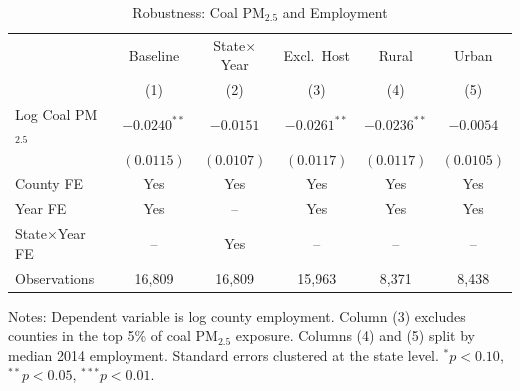 \begin{table}[t]
\centering
\caption{Robustness: Coal PM$_{2.5}$ and Employment}
\label{tab:robust}
\begin{tabular}{lccccc}
\hline\hline
 & Baseline & State$\times$Year & Excl.\ Host & Rural & Urban \\
 & (1) & (2) & (3) & (4) & (5) \\
\hline
Log Coal PM$_{2.5}$ & $-0.0240^{**}$ & $-0.0151$ & $-0.0261^{**}$ & $-0.0236^{**}$ & $-0.0054$ \\
 & $(0.0115)$ & $(0.0107)$ & $(0.0117)$ & $(0.0117)$ & $(0.0105)$ \\
\hline
County FE & Yes & Yes & Yes & Yes & Yes \\
Year FE & Yes & -- & Yes & Yes & Yes \\
State$\times$Year FE & -- & Yes & -- & -- & -- \\
Observations & 16,809 & 16,809 & 15,963 & 8,371 & 8,438 \\
\hline\hline
\end{tabular}
\begin{flushleft}\small
Notes: Dependent variable is log county employment. Column (3) excludes counties in the top 5\% of coal PM$_{2.5}$ exposure. Columns (4) and (5) split by median 2014 employment. Standard errors clustered at the state level.
$^{*}p<0.10$, $^{**}p<0.05$, $^{***}p<0.01$.
\end{flushleft}
\end{table}
